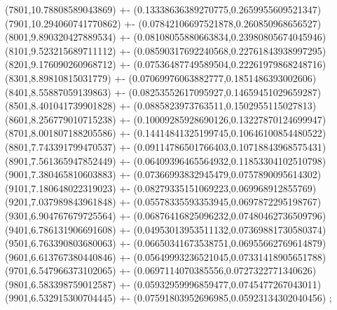 {(7801,10.78808589043869) +- (0.13338636389270775,0.2659955609521347)
(7901,10.294060741770862) +- (0.07842106697521878,0.260850968656527)
(8001,9.890320427889534) +- (0.08108055880663834,0.23980805674045946)
(8101,9.523215689711112) +- (0.08590317692240568,0.22761843938997295)
(8201,9.176090260968712) +- (0.07536487749589504,0.22261979868248716)
(8301,8.89810815031779) +- (0.07069976063882777,0.1851486393002606)
(8401,8.55887059139863) +- (0.08253552617095927,0.14659451029659287)
(8501,8.401041739901828) +- (0.0885823973763511,0.1502955115027813)
(8601,8.256779010715238) +- (0.10009285928690126,0.13227870124699947)
(8701,8.001807188205586) +- (0.14414841325199745,0.10646100854480522)
(8801,7.743391799470537) +- (0.09114786501766403,0.10718843968575431)
(8901,7.561365947852449) +- (0.06409396465564932,0.11853304102510798)
(9001,7.380465810603883) +- (0.07366993832945479,0.0757890095614302)
(9101,7.180648022319023) +- (0.08279335151069223,0.069968912855769)
(9201,7.037989843961848) +- (0.05578335593353945,0.0697872295198767)
(9301,6.904767679725564) +- (0.06876416825096232,0.07480462736509796)
(9401,6.786131906691608) +- (0.04953013953511132,0.07369881730580374)
(9501,6.763390803680063) +- (0.06650341673538751,0.06955662769614879)
(9601,6.613767380440846) +- (0.05649993236521045,0.07331418905651788)
(9701,6.547966373102065) +- (0.0697114070385556,0.0727322771340626)
(9801,6.583398759012587) +- (0.05932959996859477,0.0745477267043011)
(9901,6.532915300704445) +- (0.07591803952696985,0.05923134302040456)
};
